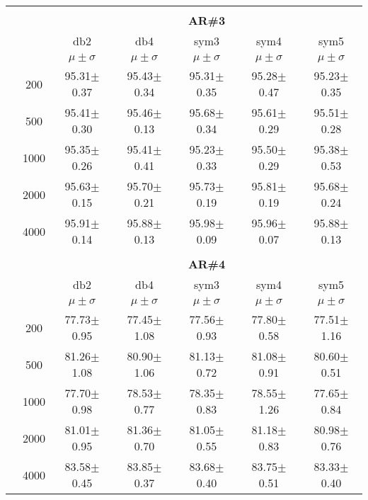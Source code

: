 \begin{table}[H]
\begin{tabular}{|c|c|c c c c c|}
 

\\ \midrule
\multicolumn{7}{c}{}\\ 



\cline{3-7}
\multicolumn{2}{c|}{\multirow{3}{*}{}} & \multicolumn{5}{c|}{\textbf{AR\#3}}   \\\cline{3-7} 
\multicolumn{2}{c|}{}  & db2 & db4 & sym3 & sym4 & sym5 \\\cline{3-7}%
\multicolumn{2}{c|}{}& $\mu \pm \sigma$ & $\mu \pm \sigma$ & $\mu \pm \sigma$ & $\mu \pm \sigma$ & $\mu \pm \sigma$ \\\hline

\multicolumn{1}{|c|}{ \multirow{5}{*}{\rotatebox[origin=c]{90}{\textbf{Neurônios}}} }
&200	&95.31$\pm$0.37	&95.43$\pm$0.34	&95.31$\pm$0.35	&95.28$\pm$0.47	&95.23$\pm$0.35\\\cline{2-7}
&500	&95.41$\pm$0.30	&95.46$\pm$0.13	&95.68$\pm$0.34	&95.61$\pm$0.29	&95.51$\pm$0.28\\\cline{2-7}
&1000	&95.35$\pm$0.26	&95.41$\pm$0.41	&95.23$\pm$0.33	&95.50$\pm$0.29	&95.38$\pm$0.53\\\cline{2-7}
&2000	&95.63$\pm$0.15	&95.70$\pm$0.21	&95.73$\pm$0.19	&95.81$\pm$0.19	&95.68$\pm$0.24\\\cline{2-7}
&4000	&95.91$\pm$0.14	&95.88$\pm$0.13	&95.98$\pm$0.09	&95.96$\pm$0.07	&95.88$\pm$0.13


 
\\\midrule

\multicolumn{7}{c}{}\\ 

\cline{3-7}
\multicolumn{2}{c|}{\multirow{3}{*}{}} & \multicolumn{5}{c|}{\textbf{AR\#4}}   \\\cline{3-7} 
\multicolumn{2}{c|}{}  & db2 & db4 & sym3 & sym4 & sym5 \\\cline{3-7}%
\multicolumn{2}{c|}{}& $\mu \pm \sigma$ & $\mu \pm \sigma$ & $\mu \pm \sigma$ & $\mu \pm \sigma$ & $\mu \pm \sigma$ \\\hline
\multicolumn{1}{|c|}{ \multirow{5}{*}{\rotatebox[origin=c]{90}{\textbf{Neurônios}}} }
&200	&77.73$\pm$0.95	&77.45$\pm$1.08	&77.56$\pm$0.93	&77.80$\pm$0.58	&77.51$\pm$1.16\\\cline{2-7}
&500	&81.26$\pm$1.08	&80.90$\pm$1.06	&81.13$\pm$0.72	&81.08$\pm$0.91	&80.60$\pm$0.51\\\cline{2-7}
&1000	&77.70$\pm$0.98	&78.53$\pm$0.77	&78.35$\pm$0.83	&78.55$\pm$1.26	&77.65$\pm$0.84\\\cline{2-7}
&2000	&81.01$\pm$0.95	&81.36$\pm$0.70	&81.05$\pm$0.55	&81.18$\pm$0.83	&80.98$\pm$0.76\\\cline{2-7}
&4000	&83.58$\pm$0.45	&83.85$\pm$0.37	&83.68$\pm$0.40	&83.75$\pm$0.51	&83.33$\pm$0.40


\end{tabular}
\end{table}
